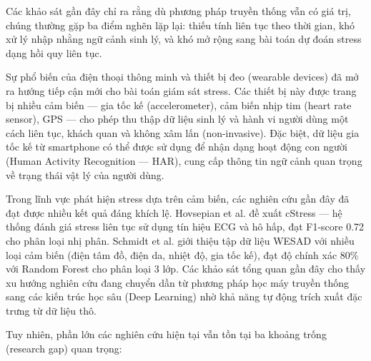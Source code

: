 Các khảo sát gần đây \cite{giannakakis2019review, dalmeida2021stress, rashid2024stress} chỉ ra rằng dù phương pháp truyền thống vẫn có giá trị, chúng thường gặp ba điểm nghẽn lặp lại: thiếu tính liên tục theo thời gian, khó xử lý nhập nhằng ngữ cảnh sinh lý, và khó mở rộng sang bài toán dự đoán stress dạng hồi quy liên tục.

Sự phổ biến của điện thoại thông minh và thiết bị đeo (wearable devices) đã mở ra hướng tiếp cận mới cho bài toán giám sát stress. Các thiết bị này được trang bị nhiều cảm biến — gia tốc kế (accelerometer), cảm biến nhịp tim (heart rate sensor), GPS — cho phép thu thập dữ liệu sinh lý và hành vi người dùng một cách liên tục, khách quan và không xâm lấn (non-invasive). Đặc biệt, dữ liệu gia tốc kế từ smartphone có thể được sử dụng để nhận dạng hoạt động con người (Human Activity Recognition — HAR), cung cấp thông tin ngữ cảnh quan trọng về trạng thái vật lý của người dùng.

Trong lĩnh vực phát hiện stress dựa trên cảm biến, các nghiên cứu gần đây đã đạt được nhiều kết quả đáng khích lệ. Hovsepian et al. \cite{hovsepian2015cstress} đề xuất cStress — hệ thống đánh giá stress liên tục sử dụng tín hiệu ECG và hô hấp, đạt F1-score 0.72 cho phân loại nhị phân. Schmidt et al. \cite{schmidt2018wesad} giới thiệu tập dữ liệu WESAD với nhiều loại cảm biến (điện tâm đồ, điện da, nhiệt độ, gia tốc kế), đạt độ chính xác 80\% với Random Forest cho phân loại 3 lớp. Các khảo sát tổng quan gần đây \cite{giannakakis2019review} cho thấy xu hướng nghiên cứu đang chuyển dần từ phương pháp học máy truyền thống sang các kiến trúc học sâu (Deep Learning) nhờ khả năng tự động trích xuất đặc trưng từ dữ liệu thô.

Tuy nhiên, phần lớn các nghiên cứu hiện tại vẫn tồn tại ba khoảng trống (research gap) quan trọng:

